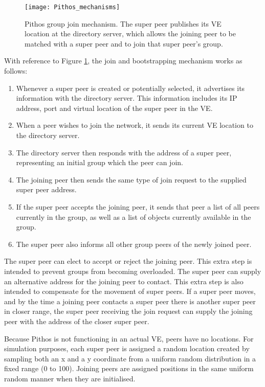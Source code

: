 \begin{figure}[htbp]
 \centering
 \texttt{[image: Pithos\_mechanisms]}
 \caption{Pithos group join mechanism. The super peer publishes its VE location at the directory server, which allows the joining peer to be matched with a super peer and to join that super peer's group.}
 \label{fig_pithos_join}
\end{figure}
%
With reference to Figure \ref{fig_pithos_join}, the join and bootstrapping mechanism works as follows:
%
\begin{enumerate}
\item Whenever a super peer is created or potentially selected, it advertises its information with the directory server. This information includes its IP address, port and virtual location of the super peer in the VE.

\item When a peer wishes to join the network, it sends its current VE location to the directory server.

\item  The directory server then responds with the address of a super peer, representing an initial group which the peer can join.

\item The joining peer then sends the same type of join request to the supplied super peer address.

\item If the super peer accepts the joining peer, it sends that peer a list of all peers currently in the group, as well as a list of objects currently available in the group.

\item The super peer also informs all other group peers of the newly joined peer.
\end{enumerate}

The super peer can elect to accept or reject the joining peer. This extra step is intended to prevent groups from becoming overloaded. The super peer can supply an alternative address for the joining peer to contact. This extra step is also intended to compensate for the movement of super peers. If a super peer moves, and by the time a joining peer contacts a super peer there is another super peer in closer range, the super peer receiving the join request can supply the joining peer with the address of the closer super peer.

Because Pithos is not functioning in an actual VE, peers have no locations. For simulation purposes, each super peer is assigned a random location created by sampling both an x and a y coordinate from a uniform random distribution in a fixed range (0 to 100). Joining peers are assigned positions in the same uniform random manner when they are initialised.

